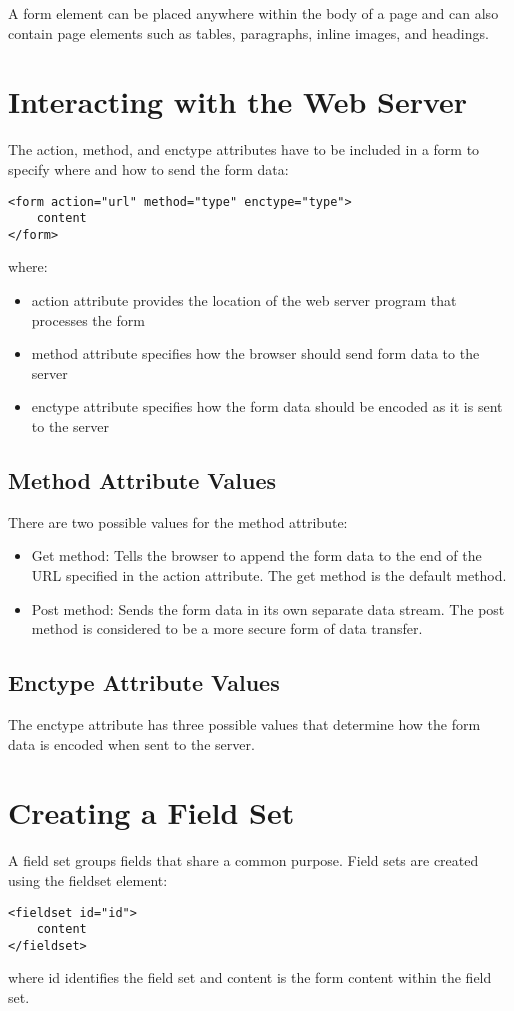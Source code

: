 \documentclass{article}
\begin{document}
A form element can be placed anywhere within the body of a page and can also contain page elements such as tables, paragraphs, inline images, and headings.

\section{Interacting with the Web Server}
The action, method, and enctype attributes have to be included in a form to specify where and how to send the form data:
\begin{lstlisting}
<form action="url" method="type" enctype="type">
    content
</form>
\end{lstlisting}
where:
\begin{itemize}
    \item action attribute provides the location of the web server program that processes the form
    \item method attribute specifies how the browser should send form data to the server
    \item enctype attribute specifies how the form data should be encoded as it is sent to the server
\end{itemize}
\subsection{Method Attribute Values}
There are two possible values for the method attribute:
\begin{itemize}
    \item Get method: Tells the browser to append the form data to the end of the URL specified in the action attribute. The get method is the default method.
    \item Post method: Sends the form data in its own separate data stream. The post method is considered to be a more secure form of data transfer.
\end{itemize}

\subsection{Enctype Attribute Values}
The enctype attribute has three possible values that determine how the form data is encoded when sent to the server.

\section{Creating a Field Set}
A field set groups fields that share a common purpose. Field sets are created using the fieldset element:
\begin{lstlisting}
<fieldset id="id">
    content
</fieldset>
\end{lstlisting}
where id identifies the field set and content is the form content within the field set.
\end{document}
